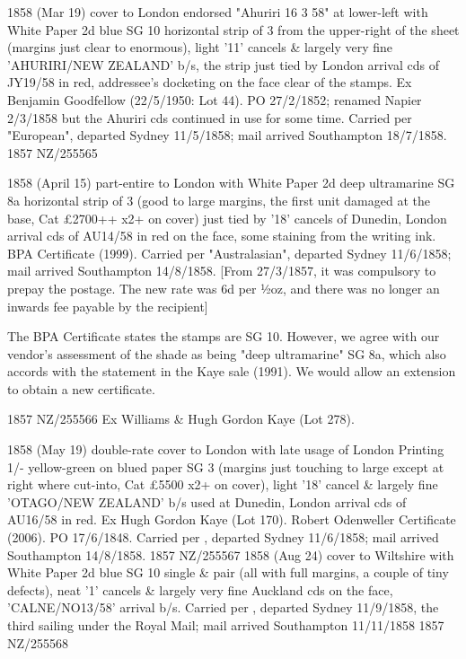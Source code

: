 \documentclass[justified]{tufte-book}
\begin{document}
%
{1858 (Mar 19) cover to London endorsed "Ahuriri 16 3 58" at lower-left with White Paper 2d blue SG 10 horizontal strip of 3 from the upper-right of the sheet (margins just clear to enormous), light '11' cancels \& largely very fine 'AHURIRI/NEW ZEALAND' b/s, the strip just tied by London arrival cds of JY19/58 in red, addressee's docketing on the face clear of the stamps. Ex Benjamin Goodfellow (22/5/1950: Lot 44). PO 27/2/1852; renamed Napier 2/3/1858 but the Ahuriri cds continued in use for some time. Carried per "European", departed Sydney 11/5/1858; mail arrived Southampton 18/7/1858. }%
{1857}%
{NZ/255565}%
{}%
{}
{}%
{}%


%
{1858 (April 15) part-entire to London with White Paper 2d deep ultramarine SG 8a horizontal strip of 3 (good to large margins, the first unit damaged at the base, Cat £2700++ x2+ on cover) just tied by '18' cancels of Dunedin, London arrival cds of AU14/58 in red on the face, some staining from the writing ink. BPA Certificate (1999). Carried per "Australasian", departed Sydney 11/6/1858; mail arrived Southampton 14/8/1858. [From 27/3/1857, it was compulsory to prepay the postage. The new rate was 6d per ½oz, and there was no longer an inwards fee payable by the recipient]

The BPA Certificate states the stamps are SG 10. However, we agree with our vendor's assessment of the shade as being "deep ultramarine" SG 8a, which also accords with the statement in the Kaye sale (1991). We would allow an extension to obtain a new certificate. }%
{1857}%
{NZ/255566}%
{Ex Williams \& Hugh Gordon Kaye (Lot 278).}%
{}
{}%
{}%

%
{1858 (May 19) double-rate cover to London with late usage of London Printing 1/- yellow-green on blued paper SG 3 (margins just touching to large except at right where cut-into, Cat \pounds{5500} x2+ on cover), light '18' cancel \& largely fine 'OTAGO/NEW ZEALAND' b/s used at Dunedin, London arrival cds of AU16/58 in red. Ex Hugh Gordon Kaye (Lot 170). Robert Odenweller Certificate (2006). PO 17/6/1848. Carried per , departed Sydney 11/6/1858; mail arrived Southampton 14/8/1858.}%
{1857}%
{NZ/255567}%
{}%
{}
{}%
{}%
%
{1858 (Aug 24) cover to Wiltshire with White Paper 2d blue SG 10 single \& pair (all with full margins, a couple of tiny defects), neat '1' cancels \& largely very fine Auckland cds on the face, 'CALNE/NO13/58' arrival b/s. Carried per , departed Sydney 11/9/1858, the third sailing under the Royal Mail; mail arrived Southampton 11/11/1858}%
{1857}%
{NZ/255568}%
{}%
{}
{}%
{}%
\end{document}
